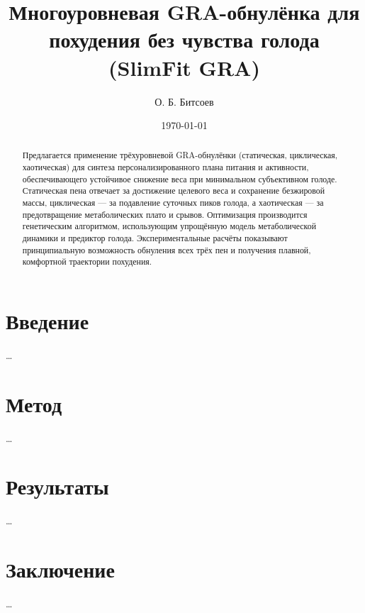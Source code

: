 \documentclass{article}
\title{Многоуровневая GRA-обнулёнка для похудения без чувства голода\\ (SlimFit GRA)}
\author{О. Б. Битсоев}
\date{\today}
\begin{document}
\maketitle

\begin{abstract}
Предлагается применение трёхуровневой GRA-обнулёнки (статическая, циклическая, хаотическая) для синтеза персонализированного плана питания и активности, обеспечивающего устойчивое снижение веса при минимальном субъективном голоде. Статическая пена отвечает за достижение целевого веса и сохранение безжировой массы, циклическая — за подавление суточных пиков голода, а хаотическая — за предотвращение метаболических плато и срывов. Оптимизация производится генетическим алгоритмом, использующим упрощённую модель метаболической динамики и предиктор голода. Экспериментальные расчёты показывают принципиальную возможность обнуления всех трёх пен и получения плавной, комфортной траектории похудения.
\end{abstract}

\section{Введение}
\dots
\section{Метод}
\dots
\section{Результаты}
\dots
\section{Заключение}
\dots



\end{document}
